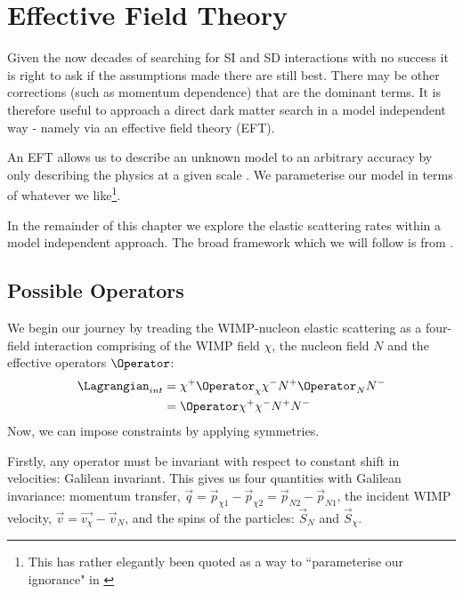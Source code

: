 \section{Effective Field Theory} \label{sec:eft_theory}

\par
Given the now decades of searching for SI and SD interactions with no success it is right to ask if the assumptions made there are still best.
There may be other corrections (such as momentum dependence) that are the dominant terms.
It is therefore useful to approach a direct dark matter search in a model independent way - namely via an effective field theory (EFT).
\par
An EFT allows us to describe an unknown model to an arbitrary accuracy by only describing the physics at a given scale \cite{eft_expo_ref}.
We parameterise our model in terms of whatever we like\footnote{This has rather elegantly been quoted as a way to ``parameterise our ignorance" in \cite{shaunalsum_thesis_ref}}.

\par
In the remainder of this chapter we explore the elastic scattering rates within a model independent approach.
The broad framework which we will follow is from \cite{Fitzpatrick_2013_ref}.

\subsection{Possible Operators}

\par
We begin our journey by treading the WIMP-nucleon elastic scattering as a four-field interaction comprising of the WIMP field $\chi$, the nucleon field $N$ and the effective operators $\Operator$:
\begin{align}
\begin{split}
    \Lagrangian_{int} &= \chi^{+} \Operator_{\chi} \chi^{-} N^{+} \Operator_{N} N^{-} \\
                      &= \Operator \chi^{+}\chi^{-} N^{+}N^{-}
\end{split}
\label{eq:eft_initial_lagrangian}
\end{align}
Now, we can impose constraints by applying symmetries.
\par
Firstly, any operator must be invariant with respect to constant shift in velocities: Galilean invariant.
This gives us four quantities with Galilean invariance: momentum transfer, $\vec{q} = \vec{p}_{\chi 1} - \vec{p}_{\chi 2} = \vec{p}_{N 2} - \vec{p}_{N 1}$, the incident WIMP velocity, $\vec{v}=\vec{v_\chi} - \vec{v}_N$, and the spins of the particles: $\vec{S}_N$ and $\vec{S}_\chi$.

